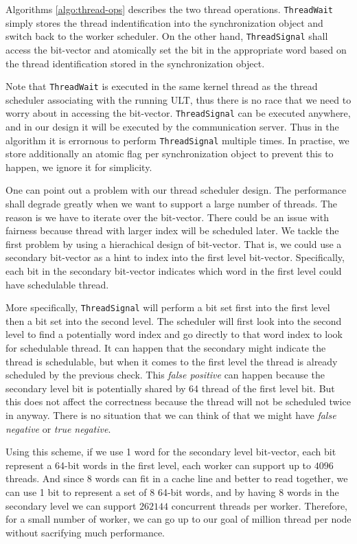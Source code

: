 \documentclass[11pt]{article}
\begin{document}
Algorithms \ref{algo:thread-ops} describes the two thread operations.
\texttt{ThreadWait} simply stores the thread indentification into the
synchronization object and switch back to the worker scheduler.  On the other
hand, \texttt{ThreadSignal} shall access the bit-vector and atomically set the
bit in the appropriate word based on the thread identification stored in the
synchronization object.

Note that \texttt{ThreadWait} is executed in the same kernel thread as the
thread scheduler associating with the running ULT, thus there is no race that
we need to worry about in accessing the bit-vector. \texttt{ThreadSignal} can
be executed anywhere, and in our design it will be executed by the
communication server. Thus in the algorithm it is errornous to perform
\texttt{ThreadSignal} multiple times. In practise, we store additionally an
atomic flag per synchronization object to prevent this to happen, we ignore it
for simplicity.

One can point out a problem with our thread scheduler design. The performance
shall degrade greatly when we want to support a large number of threads. The
reason is we have to iterate over the bit-vector. There could be an issue with
fairness because thread with larger index will be scheduled later. We tackle
the first problem by using a hierachical design of bit-vector. That is,
we could use a secondary bit-vector as a hint to index into the first level bit-vector.
Specifically, each bit in the secondary bit-vector indicates which word in
the first level could have schedulable thread.

More specifically, \texttt{ThreadSignal} will perform a bit set first into the
first level then a bit set into the second level. The scheduler will first look
into the second level to find a potentially word index and go directly to that
word index to look for schedulable thread. It can happen that the secondary
might indicate the thread is schedulable, but when it comes to the first level
the thread is already scheduled by the previous check. This \textit{false
positive} can happen because the secondary level bit is potentially shared by
64 thread of the first level bit. But this does not affect the correctness
because the thread will not be scheduled twice in anyway. There is no situation
that we can think of that we might have \textit{false negative} or \textit{true
negative}.

Using this scheme, if we use 1 word for the secondary level bit-vector, each
bit represent a 64-bit words in the first level, each worker can support up to
$4096$ threads. And since 8 words can fit in a cache line and better to read
together, we can use 1 bit to represent a set of 8 64-bit words, and by having
8 words in the secondary level we can support $262144$ concurrent threads per
worker. Therefore, for a small number of worker, we can go up to our goal of
million thread per node without sacrifying much performance.
\end{document}

